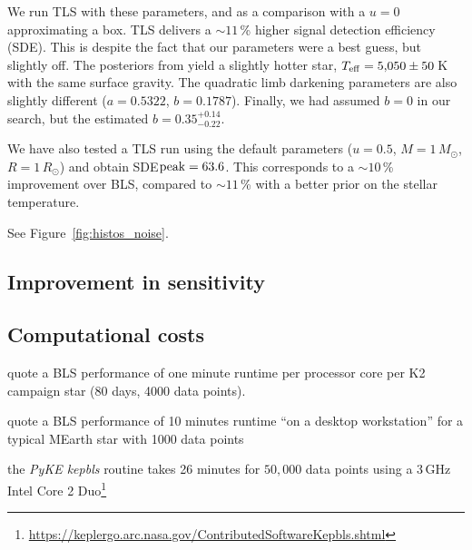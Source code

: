 \documentclass[twocolumn,tighten,longauthor]{myaastex62}
\begin{document}
We run TLS with these parameters, and as a comparison with a $u=0$ approximating a box. TLS delivers a $\sim 11\,$\% higher signal detection efficiency (SDE). This is despite the fact that our parameters were a best guess, but slightly off. The posteriors from \citet{2017A&A...604A..19O} yield a slightly hotter star, $T_{\rm eff}=5{,}050\pm50\,$K with the same surface gravity. The quadratic limb darkening parameters are also slightly different ($a=0.5322$, $b=0.1787$). Finally, we had assumed $b=0$ in our search, but the estimated $b=0.35^{+0.14}_{-0.22}$. 

We have also tested a TLS run using the default parameters ($u=0.5$, $M=1\,M_{\odot}$, $R=1\,R_{\odot}$) and obtain SDE${\rm peak}=63.6$. This corresponds to a $\sim10\,$\% improvement over BLS, compared to $\sim 11\,$\% with a better prior on the stellar temperature.















See Figure~\ref{fig:histos_noise}.


\subsection{Improvement in sensitivity}

\subsection{Computational costs}
\citep{2016ApJS..222...14V} quote a BLS performance of one minute runtime per processor core per K2 campaign star (80 days, 4000 data points).


\citep{2012AJ....144..145B} quote a BLS performance of 10 minutes runtime ``on a desktop workstation'' for a typical MEarth star with 1000 data points

the \textit{PyKE kepbls} routine \citep{2012PASP..124..963K} takes 26 minutes for $50{,}000$ data points using a 3\,GHz Intel Core 2 Duo\footnote{\url{https://keplergo.arc.nasa.gov/ContributedSoftwareKepbls.shtml}}
\end{document}
